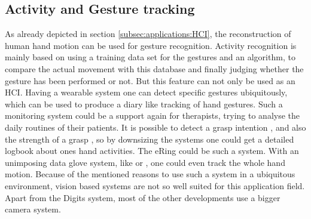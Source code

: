 {\subsection{Activity and Gesture tracking} \label{subsec:applications:activity}
As already depicted in section \ref{subsec:applications:HCI}, the reconstruction of human hand motion can be used for gesture recognition. Activity recognition is mainly based on using a training data set for the gestures and an algorithm, to compare the actual movement with this database and finally judging whether the gesture has been performed or not. But this feature can not only be used as an HCI. Having a wearable system one can detect specific gestures ubiquitously, which can be used to produce a diary like tracking of hand gestures. Such a monitoring system could be a support again for therapists, trying to analyse the daily routines of their patients. It is possible to detect a grasp intention \cite{supuk2008evaluation}, \cite{zhang2011framework} and also the strength of a grasp \cite{ekvall2005grasp}, so by downsizing the systems one could get a detailed logbook about ones hand activities. The eRing \cite{wilhelm2015ering} could be such a system. With an unimposing data glove system, like \cite{FifthDimension} or \cite{Synertial}, one could even track the whole hand motion. Because of the mentioned reasons to use such a system in a ubiquitous environment, vision based systems are not so well suited for this application field. Apart from the Digits \cite{Digits} system, most of the other developments use a bigger camera system.\\
}

